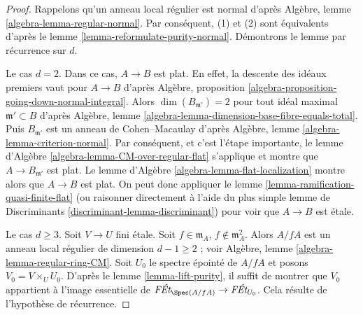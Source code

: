 \begin{proof}
Rappelons qu'un anneau local régulier est normal d'après
Algèbre, lemme \ref{algebra-lemma-regular-normal}.
Par conséquent, (1) et (2) sont équivalents d'après le
lemme \ref{lemma-reformulate-purity-normal}.
Démontrons le lemme par récurrence sur $d$.

\medskip\noindent
Le cas $d = 2$. Dans ce cas, $A \to B$ est plat.
En effet, la descente des idéaux premiers vaut pour $A \to B$ d'après
Algèbre, proposition \ref{algebra-proposition-going-down-normal-integral}.
Alors $\dim(B_{\mathfrak m'}) = 2$ pour tout idéal maximal
$\mathfrak m' \subset B$ d'après
Algèbre, lemme \ref{algebra-lemma-dimension-base-fibre-equals-total}.
Puis $B_{\mathfrak m'}$ est un anneau de Cohen--Macaulay d'après
Algèbre, lemme \ref{algebra-lemma-criterion-normal}.
Par conséquent, et c'est l'étape importante, le
lemme d'Algèbre \ref{algebra-lemma-CM-over-regular-flat}
s'applique et montre que $A \to B_{\mathfrak m'}$ est plat.
Le lemme d'Algèbre \ref{algebra-lemma-flat-localization}
montre alors que $A \to B$ est plat. On peut donc appliquer le
lemme \ref{lemma-ramification-quasi-finite-flat}
(ou raisonner directement à l'aide du plus simple
lemme de Discriminants \ref{discriminant-lemma-discriminant})
pour voir que $A \to B$ est étale.

\medskip\noindent
Le cas $d \geq 3$. Soit $V \to U$ fini étale.
Soit $f \in \mathfrak m_A$, $f \not \in \mathfrak m_A^2$.
Alors $A/fA$ est un anneau local régulier de dimension $d - 1 \geq 2$ ; voir
Algèbre, lemme \ref{algebra-lemma-regular-ring-CM}.
Soit $U_0$ le spectre épointé de $A/fA$ et posons
$V_0 = V \times_U U_0$.
D'après le lemme \ref{lemma-lift-purity},
il suffit de montrer que $V_0$ appartient à l'image essentielle
de $\textit{F\'Et}_{\Spec(A/fA)} \to \textit{F\'Et}_{U_0}$.
Cela résulte de l'hypothèse de récurrence.
\end{proof}

